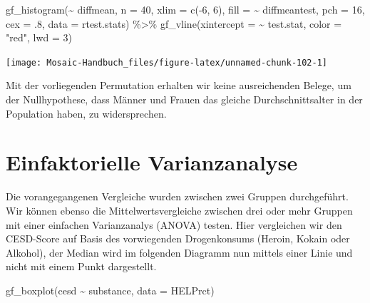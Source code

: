 \documentclass[
  ngerman,
]{scrbook}
\newenvironment{Shaded}{\begin{snugshade}}{\end{snugshade}}
\newcommand{\AttributeTok}[1]{\textcolor[rgb]{0.77,0.63,0.00}{#1}}
\newcommand{\DecValTok}[1]{\textcolor[rgb]{0.00,0.00,0.81}{#1}}
\newcommand{\FunctionTok}[1]{\textcolor[rgb]{0.00,0.00,0.00}{#1}}
\newcommand{\NormalTok}[1]{#1}
\newcommand{\SpecialCharTok}[1]{\textcolor[rgb]{0.00,0.00,0.00}{#1}}
\newcommand{\StringTok}[1]{\textcolor[rgb]{0.31,0.60,0.02}{#1}}
\begin{document}
\begin{Shaded}
\begin{Highlighting}[]
\FunctionTok{gf\_histogram}\NormalTok{(}\SpecialCharTok{\textasciitilde{}}\NormalTok{ diffmean, }\AttributeTok{n =} \DecValTok{40}\NormalTok{, }\AttributeTok{xlim =} \FunctionTok{c}\NormalTok{(}\SpecialCharTok{{-}}\DecValTok{6}\NormalTok{, }\DecValTok{6}\NormalTok{), }
               \AttributeTok{fill =} \SpecialCharTok{\textasciitilde{}}\NormalTok{ diffmeantest, }\AttributeTok{pch =} \DecValTok{16}\NormalTok{, }\AttributeTok{cex =}\NormalTok{ .}\DecValTok{8}\NormalTok{, }
               \AttributeTok{data =}\NormalTok{ rtest.stats) }\SpecialCharTok{\%\textgreater{}\%} 
  \FunctionTok{gf\_vline}\NormalTok{(}\AttributeTok{xintercept =} \SpecialCharTok{\textasciitilde{}}\NormalTok{ test.stat, }\AttributeTok{color =} \StringTok{"red"}\NormalTok{, }\AttributeTok{lwd =} \DecValTok{3}\NormalTok{)}
\end{Highlighting}
\end{Shaded}

\begin{center}\texttt{[image: Mosaic-Handbuch\_files/figure-latex/unnamed-chunk-102-1]} \end{center}

Mit der vorliegenden Permutation erhalten wir keine ausreichenden Belege, um der Nullhypothese, dass Männer und Frauen das gleiche Durchschnittsalter in der Population haben, zu widersprechen.

\hypertarget{einfaktorielle-varianzanalyse}{%
\section{Einfaktorielle Varianzanalyse}\label{einfaktorielle-varianzanalyse}}

Die vorangegangenen Vergleiche wurden zwischen zwei Gruppen durchgeführt. Wir können ebenso die Mittelwertsvergleiche zwischen drei oder mehr Gruppen mit einer einfachen Varianzanalys (ANOVA) testen. Hier vergleichen wir den CESD-Score auf Basis des vorwiegenden Drogenkonsums (Heroin, Kokain oder Alkohol), der Median wird im folgenden Diagramm nun mittels einer Linie und nicht mit einem Punkt dargestellt.

\begin{Shaded}
\begin{Highlighting}[]
\FunctionTok{gf\_boxplot}\NormalTok{(cesd }\SpecialCharTok{\textasciitilde{}}\NormalTok{ substance, }\AttributeTok{data =}\NormalTok{ HELPrct)}
\end{Highlighting}
\end{Shaded}
\end{document}
